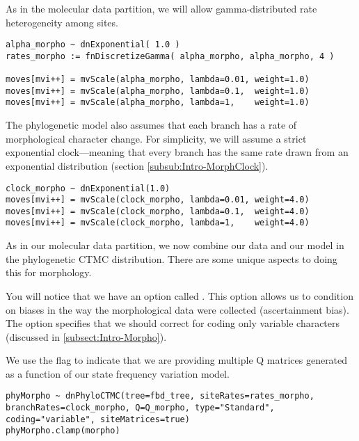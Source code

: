 As in the molecular data partition, we will allow gamma-distributed rate heterogeneity among sites.
{\tt \begin{snugshade*}
\begin{lstlisting}
alpha_morpho ~ dnExponential( 1.0 )
rates_morpho := fnDiscretizeGamma( alpha_morpho, alpha_morpho, 4 )

moves[mvi++] = mvScale(alpha_morpho, lambda=0.01, weight=1.0)
moves[mvi++] = mvScale(alpha_morpho, lambda=0.1,  weight=1.0)
moves[mvi++] = mvScale(alpha_morpho, lambda=1,    weight=1.0)
\end{lstlisting}
\end{snugshade*}}

The phylogenetic model also assumes that each branch has a rate of morphological character change.
For simplicity, we will assume a strict exponential clock---meaning that every branch has the same rate drawn from an exponential distribution (section \ref{subsub:Intro-MorphClock}).
{\tt \begin{snugshade*}
\begin{lstlisting}
clock_morpho ~ dnExponential(1.0)
moves[mvi++] = mvScale(clock_morpho, lambda=0.01, weight=4.0)
moves[mvi++] = mvScale(clock_morpho, lambda=0.1,  weight=4.0)
moves[mvi++] = mvScale(clock_morpho, lambda=1,    weight=4.0)
\end{lstlisting}
\end{snugshade*}}

As in our molecular data partition, we now combine our data and our model in the phylogenetic CTMC distribution. 
There are some unique aspects to doing this for morphology. 

You will notice that we have an option called . This option allows us to condition on biases in the way the morphological data were collected (ascertainment bias).
The option  specifies that we should correct for coding only variable characters (discussed in \ref{subsect:Intro-Morpho}). \par

We use the flag  to indicate that we are providing multiple Q matrices generated as a function of our state frequency variation model. \par


{\tt \begin{snugshade*}
\begin{lstlisting}
phyMorpho ~ dnPhyloCTMC(tree=fbd_tree, siteRates=rates_morpho, branchRates=clock_morpho, Q=Q_morpho, type="Standard", coding="variable", siteMatrices=true)
phyMorpho.clamp(morpho)
\end{lstlisting}
\end{snugshade*}}

